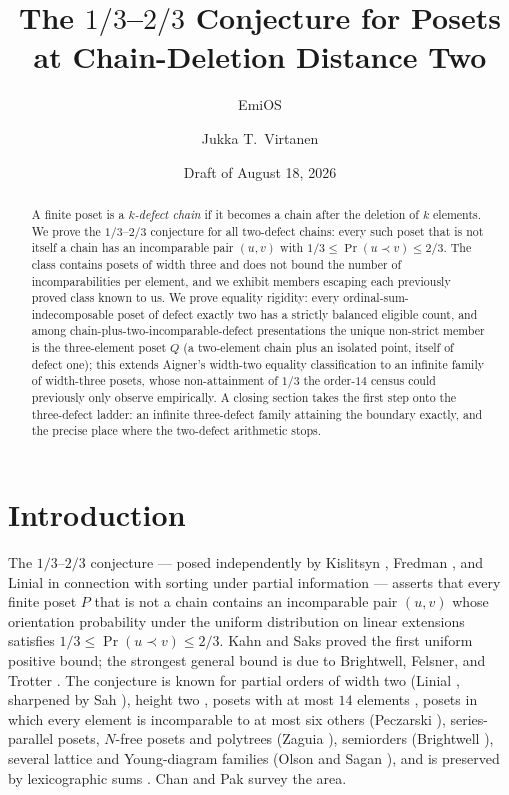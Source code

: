 \documentclass[11pt]{article}
\title{The $1/3$--$2/3$ Conjecture for Posets\\ at Chain-Deletion Distance Two}
\author{EmiOS \and Jukka T.~Virtanen}
\date{Draft of August 18, 2026}
\theoremstyle{definition}
\theoremstyle{remark}
\newcommand{\pr}{\operatorname{Pr}}
\begin{document}
\maketitle

\begin{abstract}
A finite poset is a \emph{$k$-defect chain} if it becomes a chain after the deletion of
$k$ elements. We prove the $1/3$--$2/3$ conjecture for all two-defect chains: every such
poset that is not itself a chain has an incomparable pair $(u,v)$ with
$1/3\le\pr(u\prec v)\le 2/3$. The class contains posets of width three and does not bound the number of
incomparabilities per element, and we exhibit members escaping each previously proved
class known to us. We prove equality rigidity: every ordinal-sum-indecomposable poset of
defect exactly two has a strictly balanced eligible count, and among
chain-plus-two-incomparable-defect presentations the unique non-strict member is the
three-element poset $Q$ (a two-element chain plus an isolated point, itself of defect
one); this extends Aigner's width-two equality classification to an infinite family of
width-three posets, whose non-attainment of $1/3$ the order-$14$ census could previously
only observe empirically. A closing section takes the first step onto the three-defect ladder: an
infinite three-defect family attaining the boundary exactly, and the precise place where
the two-defect arithmetic stops.
\end{abstract}

\section{Introduction}
The $1/3$--$2/3$ conjecture --- posed independently by Kislitsyn \cite{kislitsyn},
Fredman \cite{fredman}, and Linial \cite{linial} in connection with sorting under partial
information --- asserts that every finite poset $P$ that is not a chain contains an
incomparable pair $(u,v)$ whose orientation probability under the uniform distribution on
linear extensions satisfies $1/3\le\pr(u\prec v)\le 2/3$. Kahn and Saks \cite{kahn-saks}
proved the first uniform positive bound; the strongest general bound is due to Brightwell,
Felsner, and Trotter \cite{bft}. The conjecture is known for partial orders of width two
(Linial \cite{linial}, sharpened by Sah \cite{sah}), height two \cite{tgf}, posets with at
most $14$ elements \cite{deloof,gupta}, posets in which every element is incomparable to
at most six others (Peczarski \cite{peczarski-thin}), series-parallel posets, $N$-free
posets and polytrees (Zaguia \cite{zaguia-nfree,zaguia-polytree}), semiorders (Brightwell
\cite{brightwell-semi}), several lattice and Young-diagram families (Olson and Sagan
\cite{olson-sagan}), and is preserved by lexicographic sums \cite{dolores-cuenca}. Chan
and Pak \cite{chan-pak} survey the area.
\end{document}
